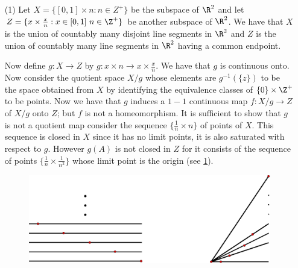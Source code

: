 \begin{example}
    \begin{enumerate}
        \item[(1)] Let $X=\{[0,1] \times n:n \in Z^+\}$ be the subspace of $\R^2$
            and let  $Z=\{x \times \frac{x}{n}: x \in [0,1] \text{ } n \in \Z^+\}$
            be another subspace of $\R^2$. We have that  $X$ is the union of
            countably many disjoint line segments in  $\R^2$ and  $Z$ is the
            union of countably many line segments in  $\R^2$ having a common endpoint.

            Now define $g:X \rightarrow Z$ by  $g:x \times n \rightarrow x \times
            \frac{x}{n}$. We have that $g$ is continuous onto. Now consider the
            quotient space  $X/g$ whose elements are  $g^{-1}(\{z\})$ to be the
            space obtained from $X$ by identifying the equivalence classes of
            $\{0\} \times \Z^+$ to be points. Now we have that $g$ induces a  $1-1$
            continuous map  $f:X/g \rightarrow Z$ of  $X/g$ onto  $Z$; but  $f$
            is not a homeomorphism. It is sufficient to show that  $g$ is not a
            quotient map consider the sequence  $\{\frac{1}{n} \times n\}$ of
            points of $X$. This sequence is closed in  $X$ since it has no limit
            points, it is also saturated with respect to  $g$. However  $g(A)$
            is not closed in $Z$ for it consists of the sequence of points
            $\{\frac{1}{n} \times \frac{1}{n^2}\}$ whose limit point is the
            origin (see \ref{fig_2.6}).

            \begin{figure}[h]
                \centering
                \includegraphics[scale = 0.5]{Figures/Chapter2/example_2_8(2).eps}
                \caption{}
                \label{fig_2.6}
            \end{figure}


\end{enumerate}
\end{example}
